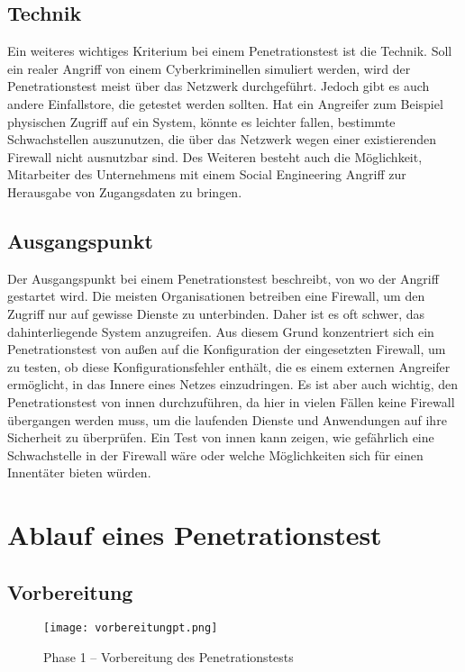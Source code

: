 \subsection{Technik}
Ein weiteres wichtiges Kriterium bei einem Penetrationstest ist die Technik. Soll ein realer Angriff von einem
Cyberkriminellen simuliert werden, wird der Penetrationstest meist über das Netzwerk durchgeführt. Jedoch
gibt es auch andere Einfallstore, die getestet werden sollten. Hat ein Angreifer zum Beispiel physischen Zugriff
auf ein System, könnte es leichter fallen, bestimmte Schwachstellen auszunutzen, die über das Netzwerk wegen einer existierenden Firewall nicht ausnutzbar sind. Des Weiteren besteht auch die Möglichkeit, Mitarbeiter des
Unternehmens mit einem Social Engineering Angriff zur Herausgabe von Zugangsdaten zu bringen\cite[15-16]{pt03bsi}.

\subsection{Ausgangspunkt}
Der Ausgangspunkt bei einem Penetrationstest beschreibt, von wo der Angriff gestartet wird. Die meisten
Organisationen betreiben eine Firewall, um den Zugriff nur auf gewisse Dienste zu unterbinden. Daher ist es oft
schwer, das dahinterliegende System anzugreifen. Aus diesem Grund konzentriert sich ein Penetrationstest von
außen auf die Konfiguration der eingesetzten Firewall, um zu testen, ob diese Konfigurationsfehler enthält, die
es einem externen Angreifer ermöglicht, in das Innere eines Netzes einzudringen. Es ist aber auch wichtig, den
Penetrationstest von innen durchzuführen, da hier in vielen Fällen keine Firewall übergangen werden muss, um
die laufenden Dienste und Anwendungen auf ihre Sicherheit zu überprüfen. Ein Test von innen kann zeigen,
wie gefährlich eine Schwachstelle in der Firewall wäre oder welche Möglichkeiten sich für einen Innentäter
bieten würden\cite[16-17]{pt03bsi}.

\section{Ablauf eines Penetrationstest}

\subsection{Vorbereitung}



\begin{figure}[h]
	\centering
	\texttt{[image: vorbereitungpt.png]}
	\caption{Phase 1 – Vorbereitung des Penetrationstests}
\end{figure}


